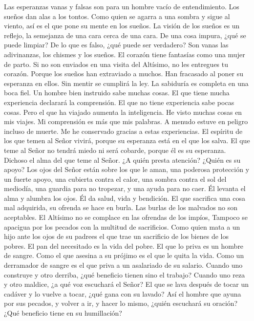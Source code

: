  Las esperanzas vanas y falsas son para un hombre vacío de
entendimiento. Los sueños dan alas a los tontos.  Como
quien se agarra a una sombra y sigue al viento, así es el que pone su
mente en los sueños.  La visión de los sueños es un
reflejo, la semejanza de una cara cerca de una cara.  De
una cosa impura, ¿qué se puede limpiar? De lo que es falso, ¿qué puede
ser verdadero?  Son vanas las adivinanzas, los chismes y
los sueños. El corazón tiene fantasías como una mujer de parto.
 Si no son enviados en una visita del Altísimo, no les
entregues tu corazón.  Porque los sueños han extraviado a
muchos. Han fracasado al poner su esperanza en ellos.  Sin
mentir se cumplirá la ley. La sabiduría es completa en una boca fiel.
 Un hombre bien instruido sabe muchas cosas. El que tiene
mucha experiencia declarará la comprensión.  El que no
tiene experiencia sabe pocas cosas. Pero el que ha viajado aumenta la
inteligencia.  He visto muchas cosas en mis viajes. Mi
comprensión es más que mis palabras.  A menudo estuve en
peligro incluso de muerte. Me he conservado gracias a estas
experiencias.  El espíritu de los que temen al Señor
vivirá, porque su esperanza está en el que los salva.  El
que teme al Señor no tendrá miedo ni será cobarde, porque él es su
esperanza.  Dichoso el alma del que teme al Señor. ¿A
quién presta atención? ¿Quién es su apoyo?  Los ojos del
Señor están sobre los que le aman, una poderosa protección y un fuerte
apoyo, una cubierta contra el calor, una sombra contra el sol del
mediodía, una guardia para no tropezar, y una ayuda para no caer.
 Él levanta el alma y alumbra los ojos. Él da salud, vida
y bendición.  El que sacrifica una cosa mal adquirida, su
ofrenda se hace en burla. Las burlas de los malvados no son aceptables.
 El Altísimo no se complace en las ofrendas de los
impíos, Tampoco se apacigua por los pecados con la multitud de
sacrificios.  Como quien mata a un hijo ante los ojos de
su padrees el que trae un sacrificio de los bienes de los pobres.
 El pan del necesitado es la vida del pobre. El que lo
priva es un hombre de sangre.  Como el que asesina a su
prójimo es el que le quita la vida. Como un derramador de sangre es el
que priva a un asalariado de su salario.  Cuando uno
construye y otro derriba, ¿qué beneficio tienen sino el trabajo?
 Cuando uno reza y otro maldice, ¿a qué voz escuchará el
Señor?  El que se lava después de tocar un cadáver y lo
vuelve a tocar, ¿qué gana con su lavado?  Así el hombre
que ayuna por sus pecados, y volver a ir, y hacer lo mismo, ¿quién
escuchará su oración? ¿Qué beneficio tiene en su humillación?

